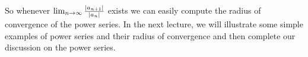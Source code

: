 \documentclass[../ComplexAnalysis_Notes.tex]{subfiles}
\begin{document}
So whenever \(\lim_{n \to \infty} \frac{\abs{a_{n+1}}}{\abs{a_n}}\) exists we can easily compute the radius of convergence of the power series. In the next lecture, we will illustrate some simple examples of power series and their radius of convergence and then complete our discussion on the power series.
\end{document}
